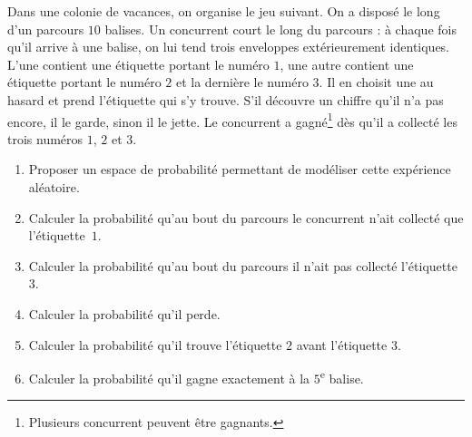 \documentclass[a4paper,12pt,reqno]{amsart}
\begin{document}
\begin{exo}

  Dans une colonie de vacances, on organise le jeu suivant. On a disposé le long d'un parcours $10$ balises. Un concurrent court le long du parcours : à chaque fois qu'il arrive à une balise, on lui tend trois enveloppes extérieurement identiques. L'une contient une étiquette portant le numéro $1$, une autre contient une étiquette portant le numéro $2$ et la dernière le numéro $3$. Il en choisit une au hasard et prend l'étiquette qui s'y trouve. S'il découvre un chiffre qu'il n'a pas encore, il le garde, sinon il le jette. Le concurrent a gagné\footnote{Plusieurs concurrent peuvent être gagnants.} dès qu'il a collecté les trois numéros $1$, $2$ et $3$.

  \begin{enumerate}
    \item Proposer un espace de probabilité permettant de modéliser cette expérience aléatoire.
    \item Calculer la probabilité qu'au bout du parcours le concurrent n'ait collecté que l'étiquette~$1$.
    \item Calculer la probabilité qu'au bout du parcours il n'ait pas collecté l'étiquette $3$.
    \item Calculer la probabilité qu'il perde.
    \item Calculer la probabilité qu'il trouve l'étiquette $2$ avant l'étiquette $3$.
    \item Calculer la probabilité qu'il gagne exactement à la $5$\textsuperscript{e} balise.
  \end{enumerate}

\end{exo}
\end{document}
